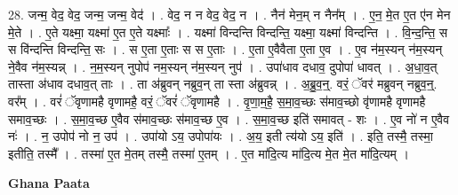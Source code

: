 \documentclass[17pt]{extarticle}
\begin{document}
28. जन्म॒ वेद॒ वेद॒ जन्म॒ जन्म॒ वेद॑ । . वेद॒ न न वेद॒ वेद॒ न । . नैन॑ मेन॒म् न नैन᳚म् । . ए॒न॒ मे॒त ए॒त ए॑न मेन मे॒ते । . ए॒ते यक्ष्मा॒ यक्ष्मा॑ ए॒त ए॒ते यक्ष्माः᳚ । . यक्ष्मा॑ विन्दन्ति विन्दन्ति॒ यक्ष्मा॒ यक्ष्मा॑ विन्दन्ति । . वि॒न्द॒न्ति॒ स स वि॑न्दन्ति विन्दन्ति॒ सः । . स ए॒ता ए॒ताः स स ए॒ताः । . ए॒ता ए॒वैवैता ए॒ता ए॒व । . ए॒व न॑म॒स्यन् न॑म॒स्यन् ने॒वैव न॑म॒स्यन्न् । . न॒म॒स्यन् नुपोप॑ नम॒स्यन् न॑म॒स्यन् नुप॑ । . उपा॑धाव दधाव॒ दुपोपा॑ धावत् । . अ॒धा॒व॒त् तास्ता अ॑धाव दधाव॒त् ताः । . ता अ॑ब्रुवन् नब्रुव॒न् ता स्ता अ॑ब्रुवन्न् । . अ॒ब्रु॒व॒न्॒. वरं॒ ॅवर॑ मब्रुवन् नब्रुव॒न्॒. वर᳚म् । . वरं॑ ॅवृणामहै वृणामहै॒ वरं॒ ॅवरं॑ ॅवृणामहै । . वृ॒णा॒म॒है॒ स॒मा॒व॒च्छः स॑माव॒च्छो वृ॑णामहै वृणामहै समाव॒च्छः । . स॒मा॒व॒च्छ ए॒वैव स॑माव॒च्छः स॑माव॒च्छ ए॒व । . स॒मा॒व॒च्छ इति॑ समावत् - शः । . ए॒व नो॑ न ए॒वैव नः॑ । . न॒ उपोप॑ नो न॒ उप॑ । . उपा॑यो ऽय॒ उपोपा॑यः । . अ॒य॒ इती त्य॑यो ऽय॒ इति॑ । . इति॒ तस्मै॒ तस्मा॒ इतीति॒ तस्मै᳚ । . तस्मा॑ ए॒त मे॒तम् तस्मै॒ तस्मा॑ ए॒तम् । . ए॒त मा॑दि॒त्य मा॑दि॒त्य मे॒त मे॒त मा॑दि॒त्यम् । \newline

\textbf{Ghana Paata } \newline
\end{document}

